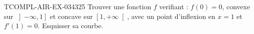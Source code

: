 \begin{exercice}{TCOMPL-AIR-EX-034}{3}{25}
Trouver une fonction $f$ verifiant : $f(0)=0$, convexe sur $\left]-\infty, 1\right]$ et concave sur $\left[1, +\infty\right[$, avec un point d'inflexion en $x=1$ et $f'(1)=0$. Esquisser sa courbe.

\end{exercice}
